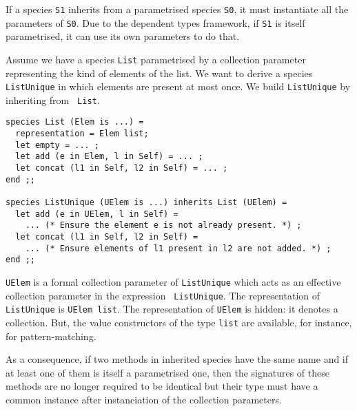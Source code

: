 \smallskip
{}
If a species {\tt S1} inherits from a parametrised species {\tt S0},
it must instantiate all the parameters of {\tt S0}. Due to the
dependent types framework, if {\tt S1} is itself
parametrised, it can use its own parameters to do that. 

Assume we
have a species {\tt List} parametrised by a collection parameter
representing the kind of elements of the list. We want to derive
a species {\tt ListUnique} in which elements are present at most
once. We build {\tt ListUnique} by inheriting from {\tt
  List}.

{\scriptsize
\begin{lstlisting}
species List (Elem is ...) =
  representation = Elem list;
  let empty = ... ;
  let add (e in Elem, l in Self) = ... ;
  let concat (l1 in Self, l2 in Self) = ... ;
end ;;

species ListUnique (UElem is ...) inherits List (UElem) =
  let add (e in UElem, l in Self) =
    ... (* Ensure the element e is not already present. *) ;
  let concat (l1 in Self, l2 in Self) =
    ... (* Ensure elements of l1 present in l2 are not added. *) ;
end ;;
\end{lstlisting}
} {\tt UElem} is a formal collection parameter of {\tt ListUnique}
which acts as an effective collection parameter in the expression {\tt
  ListUnique}. The representation of {\tt ListUnique} is {\tt UElem
  list}. The representation of {\tt UElem} is hidden: it denotes a
collection. But, the value constructors of the type {\tt list} are
available, for instance, for pattern-matching.  

As a consequence, if two methods in inherited species have the same
name and if at least one of them is itself a parametrised one, then
the signatures of these methods are no longer required to be identical
but their type must have a common instance after instanciation of the
collection parameters.

